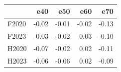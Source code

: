 \begin{tabular}{lrrrr}
\toprule
 & e40 & e50 & e60 & e70 \\
\midrule
F2020 & -0.02 & -0.01 & -0.02 & -0.13 \\
F2023 & -0.03 & -0.02 & -0.03 & -0.10 \\
H2020 & -0.07 & -0.02 & 0.02 & -0.11 \\
H2023 & -0.06 & -0.06 & 0.02 & -0.09 \\
\bottomrule
\end{tabular}
